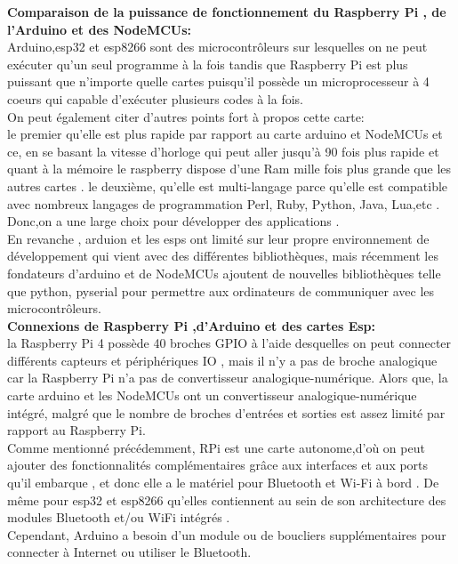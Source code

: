 \textbf{Comparaison de la puissance de fonctionnement du Raspberry Pi , de l'Arduino et des NodeMCUs:}\\
\vspace{10pt}
\newline
Arduino,esp32 et esp8266 sont des microcontrôleurs sur lesquelles on ne peut exécuter qu'un seul programme à la fois tandis que Raspberry Pi est plus puissant que n'importe quelle cartes puisqu'il possède un microprocesseur à 4 coeurs qui  capable d'exécuter  plusieurs codes à la fois. \\
 On peut  également citer d'autres points fort à propos cette carte:\\
 le premier qu'elle est plus rapide par rapport au carte arduino et NodeMCUs et ce, en se basant  la vitesse d'horloge  qui peut aller jusqu'à 90 fois plus rapide et quant à la mémoire le raspberry dispose d'une Ram mille fois plus grande que les autres cartes .
 le deuxième, qu'elle est multi-langage parce qu'elle est compatible avec  nombreux langages de programmation  Perl, Ruby, Python, Java, Lua,etc . Donc,on a une large choix pour développer des applications .\\ En revanche , arduion et les esps ont limité sur leur propre environnement de développement qui vient avec des différentes bibliothèques, mais récemment les fondateurs d'arduino et de NodeMCUs ajoutent de nouvelles bibliothèques telle que python, pyserial pour permettre aux ordinateurs  de communiquer avec les microcontrôleurs.\\
 \newline
 \textbf{Connexions de Raspberry Pi ,d'Arduino et des cartes Esp:}\\
\vspace{10pt}
\newline
 la Raspberry Pi 4 possède 40 broches GPIO  à l'aide desquelles on peut connecter différents capteurs et périphériques IO , mais il n'y a pas de broche analogique car la  Raspberry Pi n'a pas de convertisseur analogique-numérique. Alors que, la carte arduino et les NodeMCUs  ont  un convertisseur analogique-numérique intégré, malgré que le nombre de broches d'entrées et sorties est assez limité par rapport au  Raspberry Pi.\\
Comme mentionné précédemment,  RPi est une carte autonome,d'où on peut ajouter des fonctionnalités complémentaires  grâce aux interfaces et aux ports qu'il embarque , et donc elle a le matériel  pour Bluetooth et Wi-Fi à bord .
De même pour esp32 et esp8266 qu'elles contiennent au sein de son architecture des modules Bluetooth et/ou WiFi intégrés .\\
Cependant, Arduino  a  besoin d'un module ou de boucliers supplémentaires pour connecter à Internet ou utiliser le Bluetooth.\\

